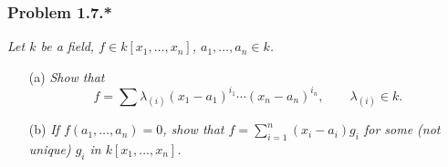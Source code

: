 \documentclass{article}
\begin{document}



\subsubsection*{Problem 1.7.*}
\emph{Let $k$ be a field, $f \in k[x_1, \ldots, x_n]$, $a_1, \ldots, a_n \in k$.}
\begin{enumerate}
\item[(a)]
  \emph{Show that}
  \[
    f = \sum \lambda_{(i)} (x_1-a_1)^{i_1} \cdots (x_n-a_n)^{i_n},
    \qquad
    \lambda_{(i)} \in k.
  \]

\item[(b)]
  \emph{If $f(a_1, \ldots, a_n) = 0$,
  show that $f = \sum_{i=1}^n (x_i-a_i) g_i$ for some (not unique) $g_i$ in $k[x_1, \ldots, x_n]$.} \\
\end{enumerate}
\end{document}
